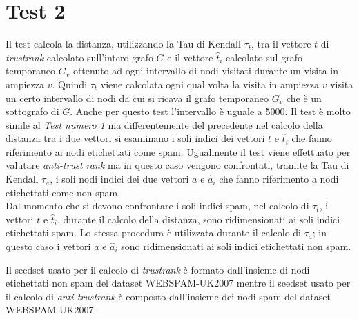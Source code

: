 \section{Test 2}
Il test  calcola la distanza, utilizzando la Tau di Kendall \(\tau_t\), tra  il vettore \(t\) di \textit{trustrank} calcolato sull'intero grafo \(G\) e il vettore \(\hat{t}_i\) calcolato sul grafo temporaneo \(G_v\) ottenuto ad ogni intervallo di nodi visitati durante un visita in ampiezza \(v\). Quindi \(\tau_t\) viene calcolata ogni qual volta la visita in ampiezza \(v\) visita un certo intervallo di nodi da cui si ricava il grafo temporaneo \(G_v\) che è un sottografo di \(G\).  Anche per questo test l'intervallo è uguale a 5000.  Il test è molto simile al \textit{Test numero 1} ma differentemente del precedente nel calcolo della distanza tra i due vettori si esaminano i soli indici dei vettori \(t\) e \(\hat{t}_i\) che fanno riferimento ai nodi etichettati come spam. Ugualmente il test viene effettuato per valutare \textit{anti-trust rank} ma in questo caso vengono confrontati, tramite la Tau di Kendall \(\tau_a\), i soli nodi indici dei due vettori \(a\) e \(\hat{a}_i\) che fanno 
riferimento a nodi etichettati come non spam.\\
Dal momento che si devono confrontare i soli indici spam, nel calcolo di \(\tau_t\), i vettori \(t\) e \(\hat{t}_i\), durante il calcolo della distanza, sono ridimensionati ai soli indici etichettati spam. Lo stessa procedura è utilizzata  durante il calcolo di \(\tau_a\); in questo caso i vettori \(a\) e \(\hat{a}_i\) sono ridimensionati ai soli indici etichettati non spam. 

Il seedset usato per il calcolo di \textit{trustrank} è formato dall'insieme di nodi etichettati non spam del dataset WEBSPAM-UK2007 mentre il seedset usato per il calcolo di \textit{anti-trustrank} è composto dall'insieme dei nodi spam del dataset WEBSPAM-UK2007.

